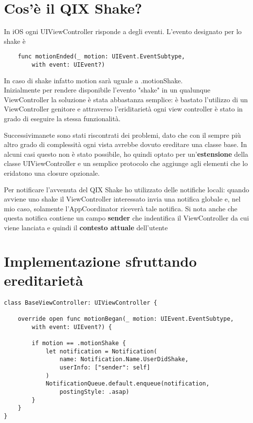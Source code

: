 
\section{Cos'è il QIX Shake?}

In iOS ogni UIViewController risponde a degli eventi. L'evento designato per lo shake è
\begin{verbatim}
    func motionEnded(_ motion: UIEvent.EventSubtype,
        with event: UIEvent?)
\end{verbatim}

In caso di shake infatto motion sarà uguale a .motionShake. \\

Inizialmente per rendere disponibile l'evento "shake" in un qualunque ViewController la soluzione è stata abbastanza semplice:
è bastato l'utilizzo di un ViewController genitore e attraverso l'eriditarietà ogni view controller è stato in grado
di eseguire la stessa funzionalità.

Successivimanete sono stati riscontrati dei problemi, dato che con il sempre più altro grado di complessità
ogni vista avrebbe dovuto ereditare una classe base. In alcuni casi questo non è stato possibile, ho quindi optato 
per un'\textbf{estensione} della classe UIViewController e un semplice protocolo che aggiunge agli elementi che lo eridatono
una closure opzionale.

Per notificare l'avvenuta del QIX Shake ho utilizzato delle notifiche locali: quando avviene uno shake il ViewController interessato invia 
una notifica globale e, nel mio caso, solamente l'AppCoordinator riceverà tale notifica.
Si nota anche che questa notifica contiene un campo \textbf{sender} che indentifica il ViewController da cui viene lanciata e quindi
il \textbf{contesto attuale} dell'utente

\section{Implementazione sfruttando ereditarietà}

\begin{verbatim}
class BaseViewController: UIViewController {

    override open func motionBegan(_ motion: UIEvent.EventSubtype,
        with event: UIEvent?) {
            
        if motion == .motionShake {
            let notification = Notification(
                name: Notification.Name.UserDidShake,
                userInfo: ["sender": self]
            )
            NotificationQueue.default.enqueue(notification,
                postingStyle: .asap)
        }
    }
}
\end{verbatim}

